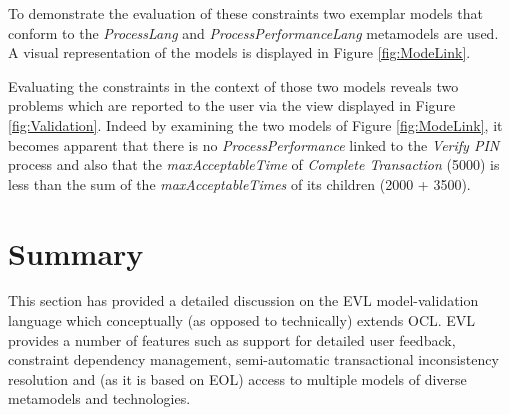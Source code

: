To demonstrate the evaluation of these constraints two exemplar models that conform to the \emph{ProcessLang} and \emph{ProcessPerformanceLang} metamodels are used. A visual representation of the models is displayed in Figure \ref{fig:ModeLink}.

Evaluating the constraints in the context of those two models reveals two problems which are reported to the user via the view displayed in Figure \ref{fig:Validation}. Indeed by examining the two models of Figure \ref{fig:ModeLink}, it becomes apparent that there is no \emph{ProcessPerformance} linked to the \emph{Verify PIN} process and also that the \emph{maxAcceptableTime} of \emph{Complete Transaction} (5000) is less than the sum of the \emph{maxAcceptableTimes} of its children (2000 + 3500).

\section{Summary}

This section has provided a detailed discussion on the EVL model-validation language which conceptually (as opposed to technically) extends OCL. EVL provides a number of features such as support for detailed user feedback, constraint dependency management, semi-automatic transactional inconsistency resolution and (as it is based on EOL) access to multiple models of diverse metamodels and technologies.